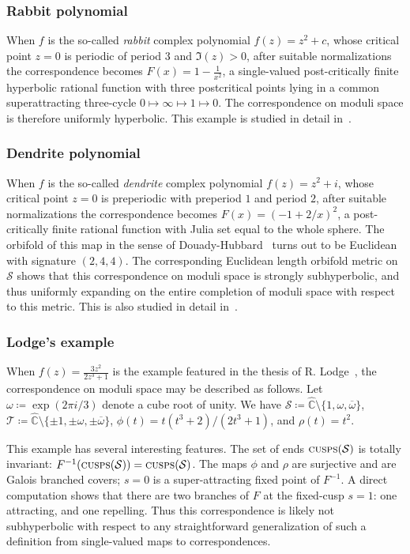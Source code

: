 \documentclass{amsart}
\newcommand\C{{\mathbb{C}}}
\newcommand{\rs}{\widehat{\C}}
\theoremstyle{definition}
\theoremstyle{remark}
\newcommand{\cT}{\mathcal{T}}
\newcommand{\cS}{\mathcal{S}}
\newcommand{\cusps}[1]{\text{\sc cusps}(#1)}
\begin{document}
\subsubsection*{Rabbit polynomial}  When $f$ is the so-called \emph{rabbit} complex polynomial $f(z)=z^2+c$, whose critical point $z=0$ is periodic of period $3$ and $\Im(z)>0$, after suitable normalizations the correspondence becomes $F(x)=1-\frac{1}{x^2}$, a single-valued post-critically finite hyperbolic rational function with three postcritical points lying in a common superattracting three-cycle $0 \mapsto\infty \mapsto 1 \mapsto 0$. The correspondence on moduli space is therefore uniformly hyperbolic. This example is studied in detail in~\cite{bartholdi:nekrashevych:twisted}.

\subsubsection*{Dendrite polynomial} When $f$ is the so-called \emph{dendrite} complex polynomial $f(z)=z^2+i$, whose critical point $z=0$ is preperiodic with preperiod $1$ and period $2$, after suitable normalizations the correspondence becomes $F(x)=(-1+2/x)^2$, a post-critically finite rational function with Julia set equal to the whole sphere. The orbifold of this map in the sense of Douady-Hubbard~\cite{MR1251582} turns out to be Euclidean with signature $(2, 4, 4)$. The corresponding Euclidean length orbifold metric on $\cS$ shows that this correspondence on moduli space is strongly subhyperbolic, and thus uniformly expanding on the entire completion of moduli space with respect to this metric. This is also studied in detail in~\cite{bartholdi:nekrashevych:twisted}.

\subsubsection*{Lodge's example} When $f(z)=\frac{3z^2}{2z^3+1}$ is the example featured in the thesis of R. Lodge~\cites{MR3063048, MR2508269}, the correspondence on moduli space may be described as follows. Let $\omega\coloneqq\exp(2\pi i /3)$ denote a cube root of unity.  We have  $\cS\coloneqq\rs \setminus \{1, \omega, \overline{\omega}\}$, $\cT\coloneqq\rs \setminus \{\pm 1, \pm \omega, \pm \overline{\omega}\}$, $\phi(t)=t(t^3+2)/(2t^3+1)$, and $\rho(t)=t^2$. 

This example has several interesting features. The set of ends $\cusps{\cS}$ is totally invariant: $F^{-1}(\cusps\cS) = \cusps{\cS}$.  The maps $\phi$ and $\rho$ are surjective and are Galois branched covers; $s=0$ is a super-attracting fixed point of $F^{-1}$.  A direct computation shows that there are two branches of $F$ at the fixed-cusp $s=1$: one attracting, and one repelling. Thus this correspondence is likely not subhyperbolic with respect to any straightforward generalization of such a definition from single-valued maps to correspondences. 
\end{document}
